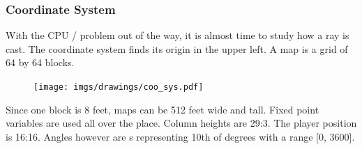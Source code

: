 \subsubsection{Coordinate System}
With the CPU / problem out of the way, it is almost time to study how a ray is cast. The coordinate system finds its origin in the upper left. A map is a grid of 64 by 64 blocks. 
\begin{figure}[H]
  \centering
 \texttt{[image: imgs/drawings/coo\_sys.pdf]}
\end{figure}
\par
Since one block is 8 feet, maps can be 512 feet wide and tall. Fixed point variables are used all over the place. Column heights are 29:3. The player position is 16:16. Angles however are s representing 10th of degrees with a range [0, 3600].

















